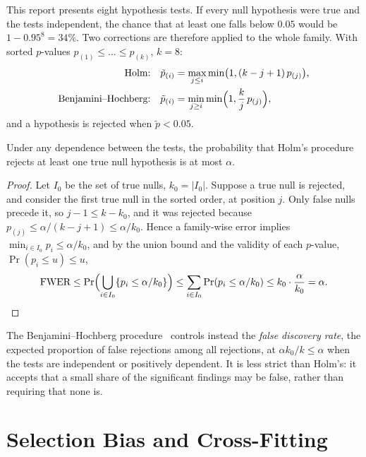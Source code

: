 This report presents eight hypothesis tests. If every null hypothesis were true and the tests independent, the chance that at least one falls below $0.05$ would be $1 - 0.95^8 = 34\%$. Two corrections are therefore applied to the whole family. With sorted $p$-values $p_{(1)} \le \dots \le p_{(k)}$, $k = 8$:
\begin{align}
  \text{Holm:} \quad & \tilde{p}_{(i)} = \max_{j \le i} \min\bigl(1, (k - j + 1)\, p_{(j)}\bigr), \\
  \text{Benjamini--Hochberg:} \quad & \tilde{p}_{(i)} = \min_{j \ge i} \min\Bigl(1, \frac{k}{j}\, p_{(j)}\Bigr),
\end{align}
and a hypothesis is rejected when $\tilde{p} < 0.05$.

\begin{theorem}
Under any dependence between the tests, the probability that Holm's procedure rejects at least one true null hypothesis is at most $\alpha$.
\end{theorem}

\begin{proof}
Let $I_0$ be the set of true nulls, $k_0 = \lvert I_0 \rvert$. Suppose a true null is rejected, and consider the first true null in the sorted order, at position $j$. Only false nulls precede it, so $j - 1 \le k - k_0$, and it was rejected because $p_{(j)} \le \alpha/(k - j + 1) \le \alpha/k_0$. Hence a family-wise error implies $\min_{i \in I_0} p_i \le \alpha / k_0$, and by the union bound and the validity of each $p$-value, $\Pr(p_i \le u) \le u$,
\[
  \text{FWER} \le \Pr\Bigl( \bigcup_{i \in I_0} \{ p_i \le \alpha/k_0 \} \Bigr) \le \sum_{i \in I_0} \Pr(p_i \le \alpha/k_0) \le k_0 \cdot \frac{\alpha}{k_0} = \alpha. \qedhere
\]
\end{proof}

The Benjamini--Hochberg procedure~\citep{benjamini1995controlling} controls instead the \emph{false discovery rate}, the expected proportion of false rejections among all rejections, at $\alpha k_0 / k \le \alpha$ when the tests are independent or positively dependent. It is less strict than Holm's: it accepts that a small share of the significant findings may be false, rather than requiring that none is.

\section{Selection Bias and Cross-Fitting}
\label{sec:crossfit}

